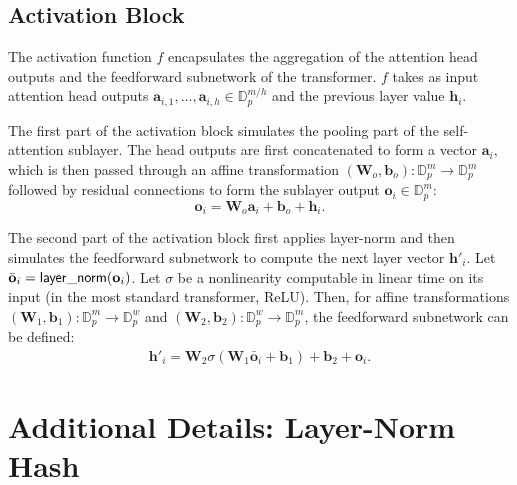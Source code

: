 \subsection{Activation Block} \label{sec:feedforward}

The activation function $f$ encapsulates the aggregation of the attention head outputs and the feedforward subnetwork of the transformer. $f$ takes as input attention head outputs $\mathbf a_{i,1}, \ldots, \mathbf a_{i,h} \in \mathbb D_p^{m/h}$ and the previous layer value $\mathbf h_i$.

The first part of the activation block simulates the pooling part of the self-attention sublayer.
The head outputs are first concatenated to form a vector $\mathbf a_i$, which is then passed through an affine transformation $(\mathbf W_o, \mathbf b_o) : \mathbb D_p^m \to \mathbb D_p^m$ followed by residual connections to form the sublayer output $\mathbf o_i \in \mathbb D_p^m$:
\begin{equation*}
    \mathbf o_i = \mathbf W_o \mathbf a_i + \mathbf b_o + \mathbf h_i .
\end{equation*}

The second part of the activation block first applies layer-norm and then simulates the feedforward subnetwork to compute the next layer vector $\mathbf h'_i$.
Let $\bar{\mathbf o}_i = \mathsf{layer\_norm}(\mathbf o_i)$.
Let $\sigma$ be a nonlinearity computable in linear time on its input (in the most standard transformer, ReLU). Then, for affine transformations $(\mathbf W_1, \mathbf b_1) : \mathbb D_p^m \to \mathbb D_p^w$ and $(\mathbf W_2, \mathbf b_2) : \mathbb D_p^w \to \mathbb D_p^m$, the feedforward subnetwork can be defined:
\begin{align*}
    \mathbf h'_i = \mathbf W_2 \sigma(\mathbf W_1 \bar{\mathbf o}_i + \mathbf b_1) + \mathbf b_2 + \mathbf o_i .
\end{align*}


\section{Additional Details: Layer-Norm Hash} \label{sec:lnorm-proof}

\lnormcanonical*

